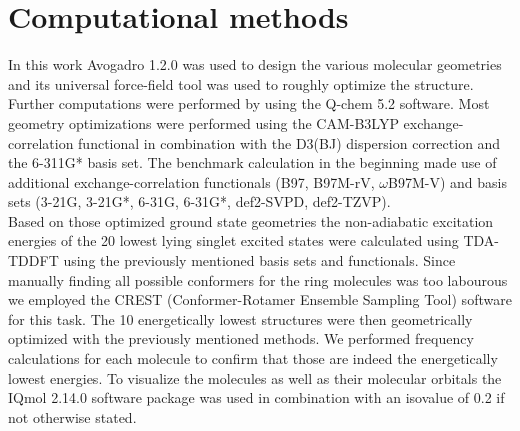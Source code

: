 \chapter{Computational methods}
In this work Avogadro 1.2.0 was used to design the various molecular geometries and its universal force-field tool was used to roughly optimize the structure. Further computations were performed by using the Q-chem 5.2 software.\cite{qchem} Most geometry optimizations were performed using the CAM-B3LYP\cite{CAMB3LYP} exchange-correlation functional in combination with the D3(BJ)\cite{DJBJ} dispersion correction and the 6-311G*\cite{6311G} basis set. The benchmark calculation in the beginning made use of additional exchange-correlation functionals (B97,\cite{B97} B97M-rV,\cite{B97MV} $\omega$B97M-V\cite{w97MV}) and basis sets (3-21G,\cite{321G} 3-21G*,\cite{321G} 6-31G,\cite{631G} 6-31G*,\cite{631G} def2-SVPD,\cite{def2} def2-TZVP\cite{def2}). \\
Based on those optimized ground state geometries the non-adiabatic excitation energies of the 20 lowest lying singlet excited states were calculated using TDA-TDDFT\cite{TDA_TDDFT} using the previously mentioned basis sets and functionals. Since manually finding all possible conformers for the ring molecules was too labourous we employed the CREST\cite{crest} (Conformer-Rotamer Ensemble Sampling Tool) software for this task. The 10 energetically lowest structures were then geometrically optimized with the previously mentioned methods. We performed frequency calculations for each molecule to confirm that those are indeed the energetically lowest energies. To visualize the molecules as well as their molecular orbitals the IQmol 2.14.0 software package was used in combination with an isovalue of 0.2 if not otherwise stated.
%
%
